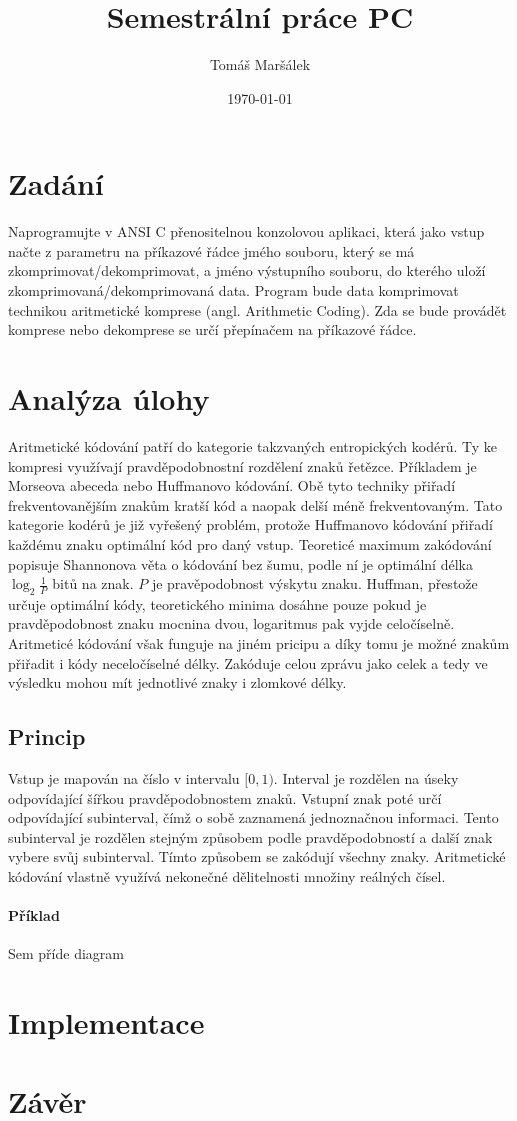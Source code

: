 \documentclass[11pt]{article}
\title{Semestrální práce PC}
\author{Tomáš Maršálek}
\date{\today}
\begin{document}
\maketitle

\section{Zadání}
Naprogramujte v ANSI C přenositelnou konzolovou aplikaci, která jako vstup
načte z parametru na příkazové řádce jmého souboru, který se má
zkomprimovat/dekomprimovat, a jméno výstupního souboru, do kterého uloží
zkomprimovaná/dekomprimovaná data. Program bude data komprimovat technikou
aritmetické komprese (angl. Arithmetic Coding). Zda se bude provádět komprese
nebo dekomprese se určí přepínačem na příkazové řádce.

\section{Analýza úlohy}
Aritmetické kódování patří do kategorie takzvaných entropických kodérů. Ty ke
kompresi využívají pravděpodobnostní rozdělení znaků řetězce. Příkladem je
Morseova abeceda nebo Huffmanovo kódování. Obě tyto techniky přiřadí
frekventovanějším znakům kratší kód a naopak delší méně frekventovaným.  Tato
kategorie kodérů je již vyřešený problém, protože Huffmanovo kódování přiřadí
každému znaku optimální kód pro daný vstup. Teoreticé maximum zakódování
popisuje Shannonova věta o kódování bez šumu, podle ní je optimální délka
$\log_2 \frac{1}{P}$ bitů na znak. $P$ je pravěpodobnost výskytu znaku.  Huffman,
přestože určuje optimální kódy, teoretického minima dosáhne pouze pokud je
pravděpodobnost znaku mocnina dvou, logaritmus pak vyjde celočíselně.
Aritmeticé kódování však funguje na jiném pricipu a díky tomu je možné znakům
přiřadit i kódy neceločíselné délky.  Zakóduje celou zprávu jako celek a tedy
ve výsledku mohou mít jednotlivé znaky i zlomkové délky.

\subsection{Princip}
Vstup je mapován na číslo v intervalu $[0, 1)$. Interval je rozdělen na úseky
odpovídající šířkou pravděpodobnostem znaků. Vstupní znak poté určí
odpovídající subinterval, čímž o sobě zaznamená jednoznačnou informaci. Tento
subinterval je rozdělen stejným způsobem podle pravděpodobností a další znak
vybere svůj subinterval. Tímto způsobem se zakódují všechny znaky. Aritmetické
kódování vlastně využívá nekonečné dělitelnosti množiny reálných čísel.

\paragraph{Příklad}
Sem příde diagram
\section{Implementace}
\section{Závěr}
\end{document}
